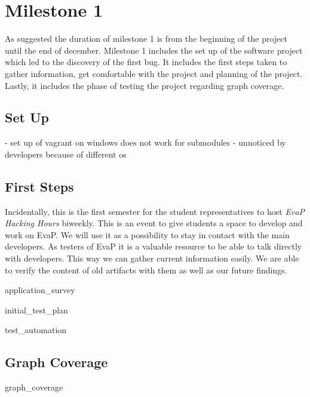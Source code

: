 \section{Milestone 1}
As suggested the duration of milestone 1 is from the beginning of the project until the end of december.
Milestone 1 includes the set up of the software project which led to the discovery of the first bug.
It includes the first steps taken to gather information, get comfortable with the project and planning of the project.
Lastly, it includes the phase of testing the project regarding graph coverage.

\subsection{Set Up}
- set up of vagrant on windows does not work for submodules
- unnoticed by developers because of different os


\subsection{First Steps}
Incidentally, this is the first semester for the student representatives to host \emph{EvaP Hacking Hours} biweekly.
This is an event to give students a space to develop and work on EvaP.
We will use it as a possibility to stay in contact with the main developers.
As testers of EvaP it is a valuable resource to be able to talk directly with developers.
This way we can gather current information easily.
We are able to verify the content of old artifacts with them as well as our future findings.

{application_survey}

{initial_test_plan}

{test_automation}

\subsection{Graph Coverage}

{graph_coverage}
